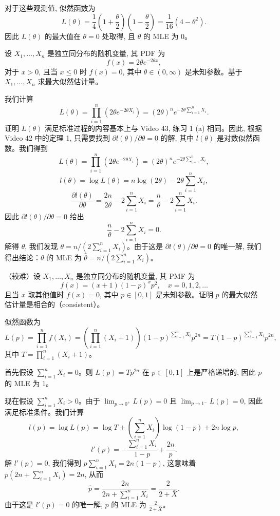 \begin{questions}
\begin{solution}
对于这些观测值, 似然函数为
\[
L(\theta) = \frac{1}{4} \left( 1 + \frac{\theta}{2} \right) \left( 1 - \frac{\theta}{2} \right) = \frac{1}{16} (4 - \theta^2).
\]
因此 $L(\theta)$ 的最大值在 $\theta = 0$ 处取得, 且 $\theta$ 的 MLE 为 0。
\end{solution}

\question
设 $X_1, \dots, X_n$ 是独立同分布的随机变量, 其 PDF 为
\[
f(x) = 2\theta e^{-2\theta x},
\]
对于 $x > 0$, 且当 $x \le 0$ 时 $f(x) = 0$, 其中 $\theta \in (0, \infty)$ 是未知参数。基于 $X_1, \dots, X_n$ 求最大似然估计量。

\begin{solution}
我们计算
\[
L(\theta) = \prod_{i=1}^n (2\theta e^{-2\theta X_i}) = (2\theta)^n e^{-2\theta \sum_{i=1}^n X_i}.
\]
证明 $L(\theta)$ 满足标准过程的内容基本上与 Video 43, 练习 1 (a) 相同。因此, 根据 Video 42 中的定理 1, 只需要找到 $\partial l(\theta) / \partial \theta = 0$ 的解, 其中 $l(\theta)$ 是对数似然函数。我们得到
\[
L(\theta) = \prod_{i=1}^n (2\theta e^{-2\theta X_i}) = (2\theta)^n e^{-2\theta \sum_{i=1}^n X_i},
\]
\[
l(\theta) = \log L(\theta) = n \log(2\theta) - 2\theta \sum_{i=1}^n X_i,
\]
\[
\frac{\partial l(\theta)}{\partial \theta} = \frac{2n}{2\theta} - 2\sum_{i=1}^n X_i = \frac{n}{\theta} - 2\sum_{i=1}^n X_i.
\]
因此 $\partial l(\theta) / \partial \theta = 0$ 给出
\[
\frac{n}{\theta} - 2\sum_{i=1}^n X_i = 0.
\]
解得 $\theta$, 我们发现 $\theta = n / \left( 2 \sum_{i=1}^n X_i \right)$。由于这是 $\partial l(\theta) / \partial \theta = 0$ 的唯一解, 我们得出结论：$\theta$ 的 MLE 为 $\hat{\theta} = n / \left( 2 \sum_{i=1}^n X_i \right)$。
\end{solution}

\question
（较难）设 $X_1, \dots, X_n$ 是独立同分布的随机变量, 其 PMF 为
\[
f(x) = (x + 1)(1 - p)^x p^2, \quad x = 0, 1, 2, \dots
\]
且当 $x$ 取其他值时 $f(x) = 0$, 其中 $p \in [0, 1]$ 是未知参数。证明 $p$ 的最大似然估计量是相合的（consistent）。

\begin{solution}
似然函数为
\[
L(p) = \prod_{i=1}^n f(X_i) = \left( \prod_{i=1}^n (X_i + 1) \right) (1 - p)^{\sum_{i=1}^n X_i} p^{2n} = T(1 - p)^{\sum_{i=1}^n X_i} p^{2n},
\]
其中 $T = \prod_{i=1}^n (X_i + 1)$。

首先假设 $\sum_{i=1}^n X_i = 0$。则 $L(p) = T p^{2n}$ 在 $p \in [0, 1]$ 上是严格递增的, 因此 $p$ 的 MLE 为 1。

现在假设 $\sum_{i=1}^n X_i > 0$。由于 $\lim_{p \to 0^+} L(p) = 0$ 且 $\lim_{p \to 1^-} L(p) = 0$, 因此满足标准条件。我们计算
\[
l(p) = \log L(p) = \log T + \left( \sum_{i=1}^n X_i \right) \log(1 - p) + 2n \log p,
\]
\[
l'(p) = -\frac{\sum_{i=1}^n X_i}{1 - p} + \frac{2n}{p}.
\]
解 $l'(p) = 0$, 我们得到 $p \sum_{i=1}^n X_i = 2n(1 - p)$, 这意味着 $p \left( 2n + \sum_{i=1}^n X_i \right) = 2n$, 从而
\[
\hat{p} = \frac{2n}{2n + \sum_{i=1}^n X_i} = \frac{2}{2 + \bar{X}}.
\]
由于这是 $l'(p) = 0$ 的唯一解, $p$ 的 MLE 为 $\frac{2}{2 + \bar{X}}$。


\end{solution}
\end{questions}
